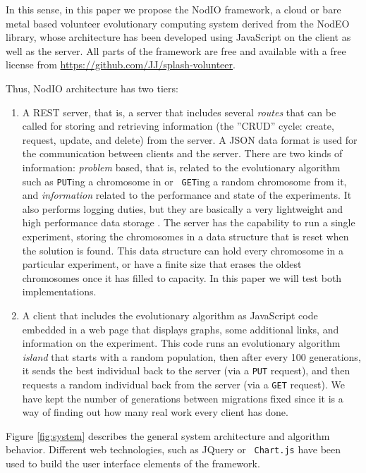 \documentclass[letterpaper]{article}
\begin{document}
In this sense, in this paper we propose the {\sf NodIO} framework, a
cloud or bare metal based volunteer evolutionary computing system
derived from the {\sf NodEO} library, whose architecture has been
developed using JavaScript on the client as well as the server.
All parts of the framework are free and available with a free license
from \url{https://github.com/JJ/splash-volunteer}.

Thus, {\sf NodIO} architecture has two tiers:\begin{enumerate}
\item A REST server, that is, a server that includes several {\em
  routes} 
  that can be called for storing and retrieving information (the ''CRUD'' cycle:
  create, request, update, and delete) from the server. 
  A JSON data format is used for the communication between 
  clients and the server. There are two kinds of information:
  {\em problem} based, that is, related to the
  evolutionary algorithm such as {\tt PUT}ing a chromosome in or {\tt
  GET}ing a random chromosome from it, and {\em information} related
  to the performance and state of the experiments. It also performs logging
  duties, but they are basically a very lightweight and high performance
  data storage \citep{jj:idc:lowcost}.
  The server has the capability to
  run a single experiment, storing the chromosomes in a data structure
  that is reset when the solution is found. This data structure can
  hold every chromosome in a particular experiment, or have a finite
  size that erases the oldest chromosomes once it has filled to
  capacity. In this paper we will test both implementations.  
\item A client that includes the evolutionary algorithm as
  JavaScript code embedded in a web page that displays graphs, some
  additional links, and information on the experiment. This code runs
  an evolutionary algorithm {\em island} that starts with a random
  population, then after every 100 generations, it sends the best individual
  back to the server (via a {\tt PUT} request), and then requests a random
  individual back from the server (via a {\tt GET} request). We have
  kept the number of generations between migrations fixed since it is
  a way of finding out how many real work every client has done. 
\end{enumerate}

Figure \ref{fig:system} describes the general system architecture and
algorithm behavior. Different web technologies, such as JQuery or {\tt
  Chart.js} have
been used to build the user interface elements of the framework.
\end{document}
